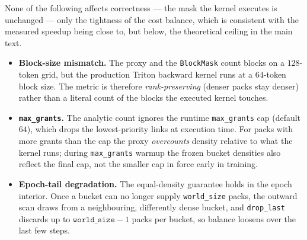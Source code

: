 None of the following affects correctness --- the mask the kernel executes is
unchanged --- only the tightness of the cost balance, which is consistent with
the measured speedup being close to, but below, the theoretical ceiling in the
main text.

\begin{itemize}
  \item \textbf{Block-size mismatch.} The proxy and the \texttt{BlockMask} count
  blocks on a $128$-token grid, but the production Triton backward kernel runs at
  a $64$-token block size. The metric is therefore \emph{rank-preserving} (denser
  packs stay denser) rather than a literal count of the blocks the executed
  kernel touches.
  \item \textbf{\texttt{max\_grants}.} The analytic count ignores the runtime
  \texttt{max\_grants} cap (default $64$), which drops the lowest-priority links
  at execution time. For packs with more grants than the cap the proxy
  \emph{overcounts} density relative to what the kernel runs; during
  \texttt{max\_grants} warmup the frozen bucket densities also reflect the final
  cap, not the smaller cap in force early in training.
  \item \textbf{Epoch-tail degradation.} The equal-density guarantee holds in the
  epoch interior. Once a bucket can no longer supply \texttt{world\_size} packs,
  the outward scan draws from a neighbouring, differently dense bucket, and
  \texttt{drop\_last} discards up to $\texttt{world\_size}-1$ packs per bucket, so
  balance loosens over the last few steps.
\end{itemize}
